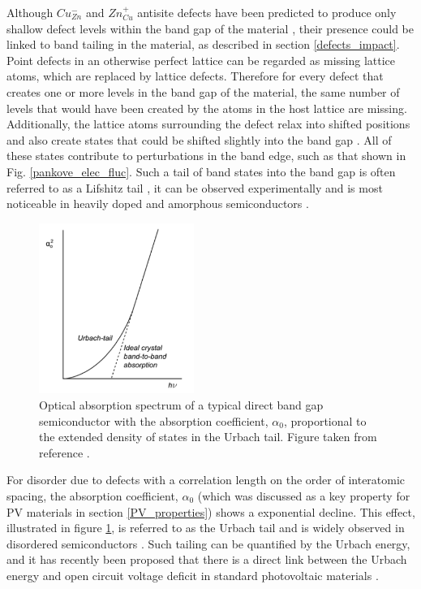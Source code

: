 \documentclass[11pt, twoside]{report}
\begin{document}
Although $Cu_{Zn}^{-}$ and $Zn_{Cu}^{+}$ antisite defects have been predicted to produce only shallow defect levels within the band gap of the material \cite{defects_Chen}, their presence could be linked to band tailing in the material, as described in section \ref{defects_impact}. 
Point defects in an otherwise perfect lattice can be regarded as missing lattice atoms, which are replaced by lattice defects. Therefore for every defect that creates one or more levels in the band gap of the material, the same number of levels that would have been created by the atoms in the host lattice are missing. Additionally, the lattice atoms surrounding the defect relax into shifted positions and also create states that could be shifted slightly into the band gap \cite{thin_film_Boer}. All of these states contribute to perturbations in the band edge, such as that shown in Fig. \ref{pankove_elec_fluc}. Such a tail of band states into the band gap is often referred to as a Lifshitz tail \cite{Lifshitz1964}, it can be observed experimentally and is most noticeable in heavily doped and amorphous semiconductors \cite{thin_film_Boer}. 
\begin{figure}[h!]
  \centering
    \includegraphics[width=0.45\textwidth]{figures/urbach_fig.png}
    \caption[Optical absorption spectrum of a typical direct band gap semiconductor with the absorption coefficient, $\alpha_{0}$, proportional to the extended density of states in the Urbach tail.]{Optical absorption spectrum of a typical direct band gap semiconductor with the absorption coefficient, $\alpha_{0}$, proportional to the extended density of states in the Urbach tail. Figure taken from reference .}
  \label{urbach_fig}
\end{figure}
For disorder due to defects with a correlation length on the order of interatomic spacing, the absorption coefficient, $\alpha_{0}$ (which was discussed as a key property for PV materials in section \ref{PV_properties}) shows a exponential decline. This effect, illustrated in figure \ref{urbach_fig}, is referred to as the Urbach tail \cite{Urbach1953} and is widely observed in disordered semiconductors \cite{thin_film_Boer}. Such tailing can be quantified by the Urbach energy, and it has recently been proposed that there is a direct link between the Urbach energy and open circuit voltage deficit in standard photovoltaic materials \cite{culprit, UrbachE_Voc}.
\end{document}
